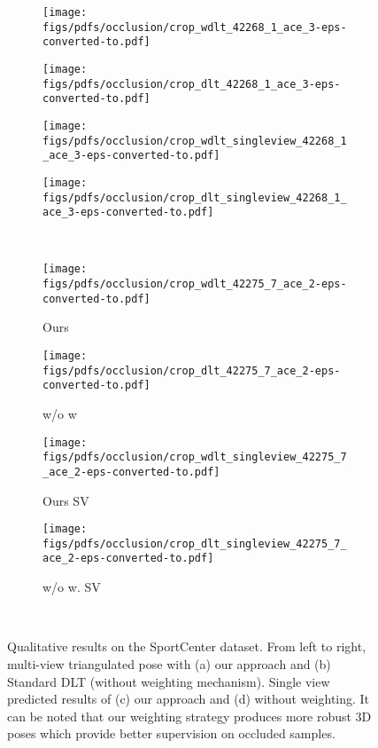 \documentclass[runningheads]{llncs}
\begin{document}
\begin{figure*}
    
    \begin{subfigure}[b]{0.24\linewidth}        \centering
        \texttt{[image: figs/pdfs/occlusion/crop\_wdlt\_42268\_1\_ace\_3-eps-converted-to.pdf]}
    \end{subfigure}
    \begin{subfigure}[b]{0.24\linewidth}        \centering
        \texttt{[image: figs/pdfs/occlusion/crop\_dlt\_42268\_1\_ace\_3-eps-converted-to.pdf]}
    \end{subfigure}
    \begin{subfigure}[b]{0.24\linewidth}        \centering
        \texttt{[image: figs/pdfs/occlusion/crop\_wdlt\_singleview\_42268\_1\_ace\_3-eps-converted-to.pdf]}
    \end{subfigure}
    \begin{subfigure}[b]{0.24\linewidth}        \centering
        \texttt{[image: figs/pdfs/occlusion/crop\_dlt\_singleview\_42268\_1\_ace\_3-eps-converted-to.pdf]}
    \end{subfigure} \\ \vspace{1mm}
    
    \begin{subfigure}[b]{0.24\linewidth}        \centering
        \texttt{[image: figs/pdfs/occlusion/crop\_wdlt\_42275\_7\_ace\_2-eps-converted-to.pdf]}
        \caption{Ours}
\end{subfigure}
    \begin{subfigure}[b]{0.24\linewidth}        \centering
        \texttt{[image: figs/pdfs/occlusion/crop\_dlt\_42275\_7\_ace\_2-eps-converted-to.pdf]}
        \caption{w/o w}
\end{subfigure}
    \begin{subfigure}[b]{0.24\linewidth}        \centering
        \texttt{[image: figs/pdfs/occlusion/crop\_wdlt\_singleview\_42275\_7\_ace\_2-eps-converted-to.pdf]}
        \caption{Ours SV}
\end{subfigure}
    \begin{subfigure}[b]{0.24\linewidth}        \centering
        \texttt{[image: figs/pdfs/occlusion/crop\_dlt\_singleview\_42275\_7\_ace\_2-eps-converted-to.pdf]}
        \caption{\small w/o w. SV}
\end{subfigure} \\    
          
    \caption{\small Qualitative results on the SportCenter dataset. From left to right, multi-view triangulated pose with (a) our approach and (b) Standard DLT (without weighting mechanism). Single view predicted results of (c) our approach and (d) without weighting. It can be noted that our weighting strategy produces more robust 3D poses which provide better supervision on occluded samples.}
    \label{fig:occlusion_images}
\end{figure*}
\end{document}
